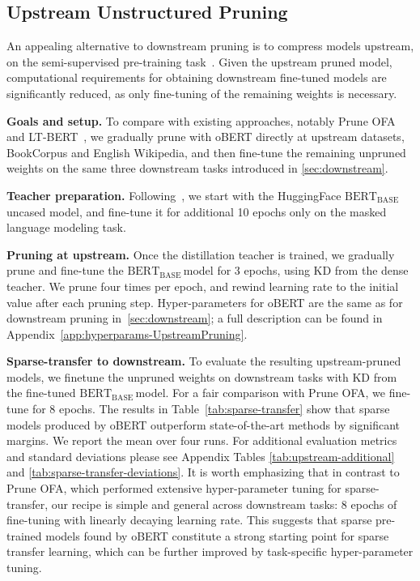 \documentclass[11pt]{article}
\newcommand{\bert}{$\textrm{BERT}_{\textrm{BASE}}\,$}
\begin{document}
\begin{table}
{{\begin{tabular}{ccc|cc|cc}
    \bottomrule
    \end{tabular}
    }
    }
    \vspace{-1.2em}
\end{table}

\subsection{Upstream Unstructured Pruning}
\label{sec:upstream}

An appealing alternative to downstream pruning is to compress models upstream, on the semi-supervised pre-training task~\cite{zafrir2021prune}. Given the upstream pruned model, computational  requirements for obtaining downstream fine-tuned models are significantly reduced, as only fine-tuning of the remaining weights is necessary.

\noindent\textbf{Goals and setup.} To compare with existing approaches, notably Prune OFA~\cite{zafrir2021prune} and LT-BERT~\cite{Chen2020TheLT}, we gradually prune with oBERT directly at upstream datasets, BookCorpus and English Wikipedia, and then fine-tune the remaining unpruned weights on the same three downstream tasks introduced in \ref{sec:downstream}.

\noindent\textbf{Teacher preparation.} Following~\citet{Liu2019RoBERTaAR}, we start with the HuggingFace \bert uncased model, and fine-tune it for additional 10 epochs only on the masked language modeling task.

\noindent\textbf{Pruning at upstream.} Once the distillation teacher is trained, we gradually prune and fine-tune the \bert model for 3 epochs, using KD from the dense teacher. We prune four times per epoch, and rewind learning rate to the initial value after each pruning step. Hyper-parameters for oBERT are the same as for downstream pruning in~\ref{sec:downstream}; a full description can be found in Appendix~\ref{app:hyperparams-UpstreamPruning}.

\noindent\textbf{Sparse-transfer to downstream.} To evaluate the resulting upstream-pruned models, we finetune the unpruned weights on downstream tasks with KD from the fine-tuned \bert model. For a fair comparison with Prune OFA, we fine-tune for 8 epochs. The results in Table~\ref{tab:sparse-transfer} show that sparse models produced by oBERT outperform state-of-the-art methods by significant margins. We report the mean over four runs. For additional evaluation metrics and standard deviations please see Appendix Tables \ref{tab:upstream-additional} and \ref{tab:sparse-transfer-deviations}. It is worth emphasizing that in contrast to Prune OFA, which performed extensive hyper-parameter tuning for sparse-transfer, our recipe is simple and general across downstream tasks: 8 epochs of fine-tuning with linearly decaying learning rate. 
This suggests that sparse pre-trained models found by oBERT constitute a strong starting point for sparse transfer learning, which can be further improved by task-specific hyper-parameter tuning.
\end{document}
